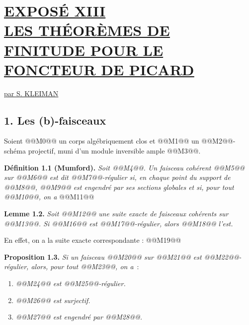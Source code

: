 
\section*{\underline{EXPOS\'E XIII}\\[3pt] \underline{\underline{LES TH\'EOR\`EMES DE FINITUDE POUR LE FONCTEUR DE PICARD}}}
\begin{center}
\underline{par S. KLEIMAN}
\end{center}

\subsection*{1. Les (b)-faisceaux}
Soient @@M0@@ un corps alg\'ebriquement clos et @@M1@@ un @@M2@@-sch\'ema projectif, muni d'un module inversible ample @@M3@@.

\textbf{D\'efinition 1.1 (Mumford).} \emph{Soit @@M4@@. Un faisceau coh\'erent @@M5@@ sur @@M6@@ est dit \emph{@@M7@@-r\'egulier} si, en chaque point du support de @@M8@@, @@M9@@ est engendr\'e par ses sections globales et si, pour tout @@M10@@, on a}
@@M11@@

\textbf{Lemme 1.2.} \emph{Soit @@M12@@ une suite exacte de faisceaux coh\'erents sur @@M13@@}\emph{. Si @@M16@@ est @@M17@@-r\'egulier, alors @@M18@@ l'est.}

En effet, on a la suite exacte correspondante :
@@M19@@

\textbf{Proposition 1.3.} \emph{Si un faisceau @@M20@@ sur @@M21@@ est @@M22@@-r\'egulier, alors, pour tout @@M23@@, on a}~:
\begin{enumerate}[label=(\roman*)]
\item \emph{@@M24@@ est @@M25@@-r\'egulier.}
\item \emph{@@M26@@ est surjectif.}
\item \emph{@@M27@@ est engendr\'e par @@M28@@.}
\end{enumerate}

